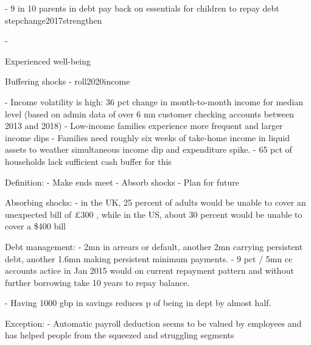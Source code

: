 
- 9 in 10 parents in debt pay back on essentials for children to repay debt
stepchange2017strengthen

- 

Experienced well-being

Buffering shocks
- roll2020income

\citet{jpmorgan2019weathering}
- Income volatility is high: 36 pct change in month-to-month income for median
level (based on admin data of over 6 mn customer checking accounts between 2013
and 2018)
- Low-income families experience more frequent and larger income dips
- Families need roughly six weeks of take-home income in liquid assets to
weather simultaneous income dip and expenditure spike.
- 65 pct of households lack sufficient cash buffer for this







Definition:
- Make ends meet
- Absorb shocks
- Plan for future

Absorbing shocks:
- in the UK, 25 percent of adults would be unable to cover an unexpected
bill of \pounds300 \citep{philipps2021supporting}, while in the US, about 30
percent would be unable to cover a \$400 bill \citep{fed2022economic}

Debt management:
\citet{fca2016credit}
- 2mn in arrears or default, another 2mn carrying persistent debt, another
1.6mn making persistent minimum payments.
- 9 pct / 5mn cc accounts actice in Jan 2015 would on current repayment pattern
and without further borrowing take 10 years to repay balance.



\citet{stepchange2017strengthening}
- Having 1000 gbp in savings reduces p of being in dept by almost half. 



Exception:
\citet{philipps2021supporting}
- Automatic payroll deduction seems to be valued by employees and has helped
people from the squeezed and struggling segments 






